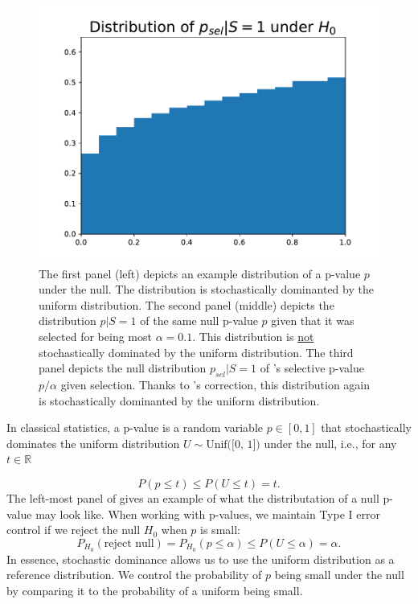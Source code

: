 \documentclass{article}
\newcommand{\R}{\mathbb{R}}
\begin{document}
\begin{figure}[]
{\begin{minipage}{0.33\textwidth}
        \centering
        \includegraphics[width=\textwidth]{p_sel_dist_given.pdf}
    \end{minipage}
    }
    \caption{The first panel (left) depicts an example distribution of a p-value $p$ under the null. The distribution is stochastically dominanted by the uniform distribution. The second panel (middle) depicts the distribution $p | S = 1$ of the same null p-value $p$ given that it was selected for being most $\alpha=0.1$. This distribution is \underline{not} stochastically dominated by the uniform distribution. The third panel depicts the null distribution $p_{sel}|S=1$ of 's selective p-value $p/\alpha$ given selection. Thanks to 's correction, this distribution again is stochastically dominanted by the uniform distribution.}
    \label{fig:distributions}
\end{figure}

In classical statistics, a p-value is a random variable $p \in [0, 1]$ that stochastically dominates the uniform distribution $U \sim \text{Unif([0, 1])}$ under the null, i.e., for any $t \in \R$ 

\begin{equation*}
    P(p \leq t) \leq P(U \leq t)= t.
\end{equation*}
The left-most panel of  gives an example of what the distributation of a null p-value may look like. When working with p-values, we maintain Type I error control if we reject the null $H_0$ when $p$ is small:
\begin{equation*}
    P_{H_0}(\text{reject null}) = P_{H_0}(p \leq \alpha) \leq P(U \leq \alpha)  = \alpha.
\end{equation*}
In essence, stochastic dominance allows us to use the uniform distribution as a reference distribution. We control the probability of $p$ being small under the null by comparing it to the probability of a uniform being small. 
\end{document}
